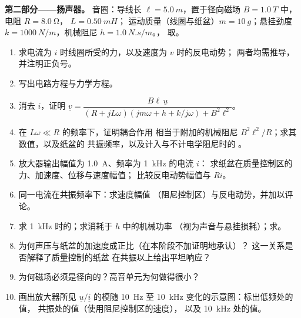 \begin{problem}
\medskip
\noindent\textbf{第二部分——扬声器。}
音圈：导线长 $\ell = \qty{5.0}{m}$，置于径向磁场 $B =
\qty{1.0}{T}$ 中，电阻 $R = \qty{8.0}{\ohm}$， $L = \qty{0.50}{mH}$；
运动质量（线圈与纸盆）$m = \qty{10}{g}$；悬挂劲度
$k = \qty{1000}{N/m}$，机械阻尼 $h = \qty{1.0}{N.s/m}$。，
取。
\begin{enumerate}[resume]
  \item 求电流为 $i$ 时线圈所受的力，以及速度为 $v$ 时的反电动势；
        两者均需推导，并注明正负号。
  \item 写出电路方程与力学方程。
  \item 消去 $i$，证明
        $\underline v = \dfrac{B\ell\,\underline u}{(R + jL\omega)(jm\omega + h + k/j\omega) + B^2\ell^2}$。
  \item 在 $L\omega \ll R$ 的频率下，证明耦合作用
        相当于附加的机械阻尼 $B^2\ell^2/R$；求其数值，以及纸盆的
        共振频率，以及计入与不计电学阻尼时的
        。
  \item 放大器输出幅值为 \qty{1.0}{A}、频率为 \qty{1}{kHz} 的电流 $i$：
        求纸盆在质量控制区的力、加速度、位移与速度幅值；
        比较反电动势幅值与
        $Ri$。
  \item 同一电流在共振频率下：求速度幅值
        （阻尼控制区）与反电动势，并加以评论。
  \item 求 \qty{1}{kHz} 时的；求消耗于 $h$ 中的机械功率
        （视为声音与悬挂损耗）；求。
  \item 为何声压与纸盆的加速度成正比（在本阶段不加证明地承认）？
        这一关系是否解释了质量控制的纸盆
        在共振以上给出平坦响应？
  \item 为何磁场必须是径向的？高音单元为何做得很小？
  \item 画出放大器所见 $\underline u/\underline i$ 的模随
        \qty{10}{Hz} 至 \qty{10}{kHz} 变化的示意图：标出低频处的值，
        共振处的值（使用阻尼控制区的速度），
        以及 \qty{10}{kHz} 处的值。
\end{enumerate}


\end{problem}
